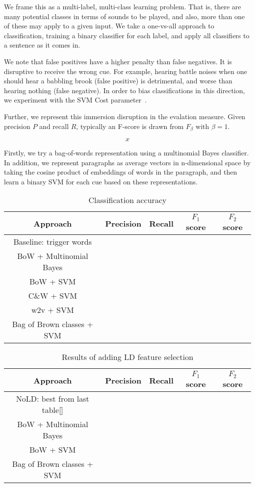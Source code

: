 \documentclass[10pt,a4paper]{article}
\begin{document}
We frame this as a multi-label, multi-class learning problem.
That is, there are many potential classes in terms of sounds to be played, and also, more than one of these may apply to a given input.
We take a one-vs-all approach to classification, training a binary classifier for each label, and apply all classifiers to a sentence as it comes in.

We note that false positives have a higher penalty than false negatives.
It is disruptive to receive the wrong cue.
For example, hearing battle noises when one should hear a babbling brook (false positive) is detrimental, and worse than hearing nothing (false negative).
In order to bias classifications in this direction, we experiment with the SVM Cost parameter~\cite{morik1999combining}.

Further, we represent this immersion disruption in the evalation measure.
Given precision $P$ and recall $R$, typically an F-score is drawn from $F_\beta$ with $\beta=1$.

\begin{equation}
x
\end{equation}


Firstly, we try a bag-of-words representation using a multinomial Bayes classifier.
In addition, we represent paragraphs as average vectors in n-dimensional space by taking the cosine product of embeddings of words in the paragraph, and then learn a binary SVM for each cue based on these representations.





\begin{table*}
\centering
\footnotesize
\begin{tabular}{c|cccc}
\hline
{\bf Approach} & {\bf Precision} & {\bf Recall} & {\bf $F_1$ score} & {\bf $F_2$ score} \\
\hline
Baseline: trigger words &&&& \\
BoW + Multinomial Bayes &&&& \\
BoW + SVM &&&& \\
C\&W + SVM &&&& \\
w2v + SVM &&&& \\
Bag of Brown classes + SVM &&&& \\
\hline
\end{tabular}
\caption{Classification accuracy}
\label{ref:results-main}
\end{table*}

\begin{table*}
\centering
\footnotesize
\begin{tabular}{c|cccc}
\hline
{\bf Approach} & {\bf Precision} & {\bf Recall} & {\bf $F_1$ score} & {\bf $F_2$ score} \\
\hline
NoLD: best from last table[] &&&& \\
BoW + Multinomial Bayes &&&& \\
BoW + SVM &&&& \\
Bag of Brown classes + SVM &&&& \\
\hline
\end{tabular}
\caption{Results of adding LD feature selection}
\label{ref:ld-selection}
\end{table*}
\end{document}
